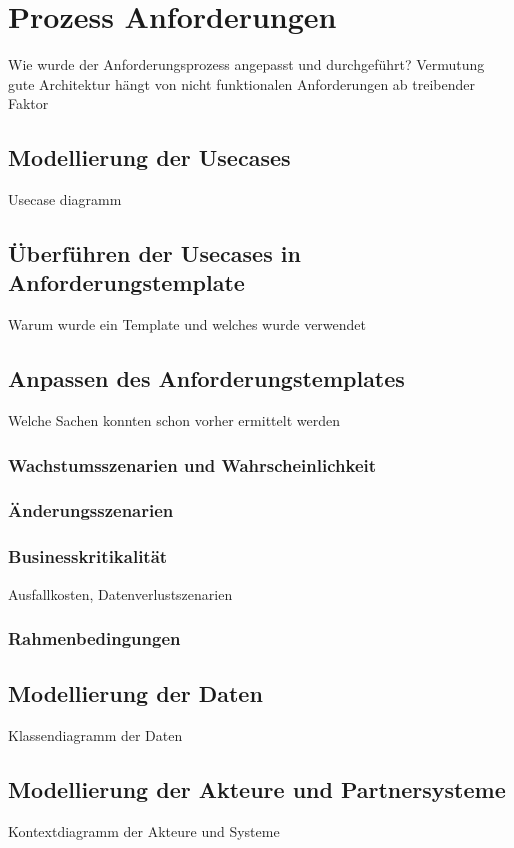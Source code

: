\chapter{Prozess Anforderungen}
Wie wurde der Anforderungsprozess angepasst und durchgeführt? Vermutung gute Architektur hängt von nicht funktionalen Anforderungen ab treibender Faktor

\section{Modellierung der Usecases}
Usecase diagramm

\section{Überführen der Usecases in Anforderungstemplate}
Warum wurde ein Template und welches wurde verwendet

\section{Anpassen des Anforderungstemplates}
Welche Sachen konnten schon vorher ermittelt werden
\subsection{Wachstumsszenarien und Wahrscheinlichkeit}
\subsection{Änderungsszenarien}
\subsection{Businesskritikalität}
Ausfallkosten, Datenverlustszenarien
\subsection{Rahmenbedingungen}

\section{Modellierung der Daten}
Klassendiagramm der Daten

\section{Modellierung der Akteure und Partnersysteme}
Kontextdiagramm der Akteure und Systeme
